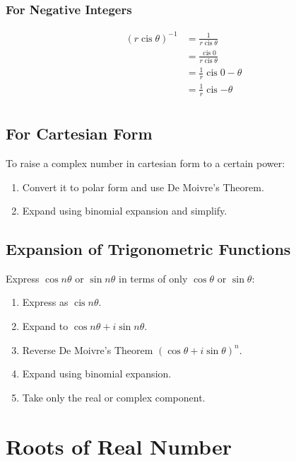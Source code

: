 \documentclass[a4paper,11pt]{article}
\DeclareMathOperator\cis{cis}
\begin{document}
\subsubsection{For Negative Integers}

$$
\begin{aligned}
(r \cis{\theta})^{-1} & = \frac{1}{r \cis{\theta}} \\
& = \frac{\cis{0}}{r \cis{\theta}} \\
& = \frac{1}{r} \cis{0 - \theta} \\
& = \frac{1}{r} \cis{-\theta} \\
\end{aligned}
$$


\subsection{For Cartesian Form}

To raise a complex number in cartesian form to a certain power:

\begin{enumerate}
\item Convert it to polar form and use De Moivre's Theorem.
\item Expand using binomial expansion and simplify.
\end{enumerate}


\subsection{Expansion of Trigonometric Functions}

Express $\cos{n \theta}$ or $\sin{n \theta}$ in terms of only $\cos{\theta}$ or
$\sin{\theta}$:

\begin{enumerate}
\item Express as $\cis{n \theta}$.
\item Expand to $\cos{n \theta} + i \sin{n \theta}$.
\item Reverse De Moivre's Theorem $(\cos{\theta} + i \sin{\theta})^n$.
\item Expand using binomial expansion.
\item Take only the real or complex component.
\end{enumerate}




\section{Roots of Real Number}
\end{document}
